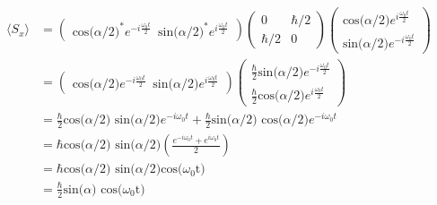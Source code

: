 \begin{equation}
\begin{split}
  \langle S_{x} \rangle & =  \begin{pmatrix} \textrm{cos($\alpha$/2)}^{*} e^{-i \frac{\omega_{0}t}{2}} \,\,\, \textrm{sin($\alpha$/2)}^{*} e^{i \frac{\omega_{0}t}{2}} \end{pmatrix}   \begin{pmatrix} 0 & \hbar/2\\ \hbar/2 & 0 \end{pmatrix}  \begin{pmatrix} \textrm{cos($\alpha$/2)} e^{i \frac{\omega_{0}t}{2}}\\ \textrm{sin($\alpha$/2)} e^{-i \frac{\omega_{0}t}{2}} \end{pmatrix}  \\
  & =  \begin{pmatrix} \textrm{cos($\alpha$/2)} e^{-i \frac{\omega_{0}t}{2}} \,\,\, \textrm{sin($\alpha$/2)} e^{i \frac{\omega_{0}t}{2}} \end{pmatrix}  \begin{pmatrix} \frac{\hbar}{2}\textrm{sin($\alpha$/2)} e^{-i \frac{\omega_{0}t}{2}} \\ \frac{\hbar}{2}\textrm{cos($\alpha$/2)} e^{i \frac{\omega_{0}t}{2}} \end{pmatrix}  \\
  & = \frac{\hbar}{2} \textrm{cos($\alpha$/2) sin($\alpha$/2)} e^{-i \omega_{0}t} + \frac{\hbar}{2} \textrm{sin($\alpha$/2) cos($\alpha$/2)} e^{-i \omega_{0}t} \\
  & = \hbar \textrm{cos($\alpha$/2) sin($\alpha$/2)}(\frac{e^{-i \omega_{0}t} + e^{i \omega_{0}t}}{2}) \\
  & = \hbar \textrm{cos($\alpha$/2) sin($\alpha$/2)} \textrm{cos($\omega_{0}$t)} \\
  & = \frac{\hbar}{2}\textrm{sin($\alpha$) cos($\omega_{0}$t)}
\end{split}
\end{equation}

